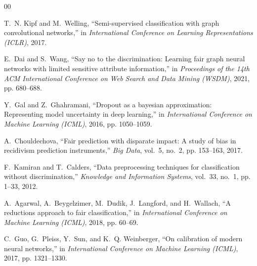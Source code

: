 \documentclass[conference, a4paper]{IEEEtran}
\begin{document}
\begin{thebibliography}{00}

T.~N. Kipf and M.~Welling, ``Semi-supervised classification with graph convolutional networks,'' in \emph{International Conference on Learning Representations (ICLR)}, 2017.

E.~Dai and S.~Wang, ``Say no to the discrimination: Learning fair graph neural networks with limited sensitive attribute information,'' in \emph{Proceedings of the 14th ACM International Conference on Web Search and Data Mining (WSDM)}, 2021, pp. 680--688.

Y.~Gal and Z.~Ghahramani, ``Dropout as a bayesian approximation: Representing model uncertainty in deep learning,'' in \emph{International Conference on Machine Learning (ICML)}, 2016, pp. 1050--1059.

A.~Chouldechova, ``Fair prediction with disparate impact: A study of bias in recidivism prediction instruments,'' \emph{Big Data}, vol.~5, no.~2, pp. 153--163, 2017.

F.~Kamiran and T.~Calders, ``Data preprocessing techniques for classification without discrimination,'' \emph{Knowledge and Information Systems}, vol.~33, no.~1, pp. 1--33, 2012.

A.~Agarwal, A.~Beygelzimer, M.~Dudik, J.~Langford, and H.~Wallach, ``A reductions approach to fair classification,'' in \emph{International Conference on Machine Learning (ICML)}, 2018, pp. 60--69.

C.~Guo, G.~Pleiss, Y.~Sun, and K.~Q. Weinberger, ``On calibration of modern neural networks,'' in \emph{International Conference on Machine Learning (ICML)}, 2017, pp. 1321--1330.

\end{thebibliography}
\end{document}
